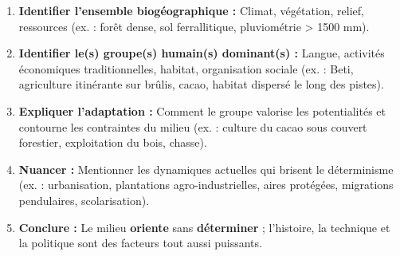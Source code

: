 \documentclass[11pt]{article}
\begin{document}
\begin{methode}
\begin{enumerate}
    \item \textbf{Identifier l'ensemble biogéographique :} Climat, végétation, relief, ressources (ex. : forêt dense, sol ferrallitique, pluviométrie > 1500 mm).
    \item \textbf{Identifier le(s) groupe(s) humain(s) dominant(s) :} Langue, activités économiques traditionnelles, habitat, organisation sociale (ex. : Beti, agriculture itinérante sur brûlis, cacao, habitat dispersé le long des pistes).
    \item \textbf{Expliquer l'adaptation :} Comment le groupe valorise les potentialités et contourne les contraintes du milieu (ex. : culture du cacao sous couvert forestier, exploitation du bois, chasse).
    \item \textbf{Nuancer :} Mentionner les dynamiques actuelles qui brisent le déterminisme (ex. : urbanisation, plantations agro-industrielles, aires protégées, migrations pendulaires, scolarisation).
    \item \textbf{Conclure :} Le milieu \textbf{oriente} sans \textbf{déterminer} ; l'histoire, la technique et la politique sont des facteurs tout aussi puissants.
\end{enumerate}
\end{methode}
\end{document}
